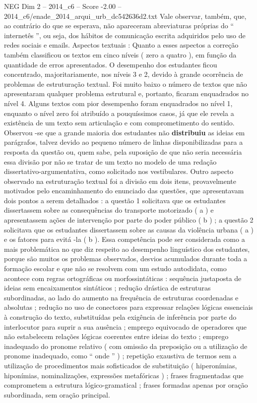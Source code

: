 \begin{textsample}{NEG Dim 2 – 2014\_c6 – Score -2.00 – 2014\_c6/enade\_2014\_arqui\_urb\_dc542636d2.txt}
Vale observar, também, que, ao contrário do que se esperava, não apareceram abreviaturas próprias do “ internetês ”, ou seja, dos hábitos de comunicação escrita adquiridos pelo uso de redes sociais e emails.
Aspectos textuais : Quanto a esses aspectos a correção também classificou os textos em cinco níveis ( zero a quatro ), em função da quantidade de erros apresentados.
O desempenho dos estudantes ficou concentrado, majoritariamente, nos níveis 3 e 2, devido à grande ocorrência de problemas de estruturação textual.
Foi muito baixo o número de textos que não apresentaram qualquer problema estrutural e, portanto, ficaram enquadrados no nível 4.
Alguns textos com pior desempenho foram enquadrados no nível 1, enquanto o nível zero foi atribuído a pouquíssimos casos, já que ele revela a existência de um texto sem articulação e com comprometimento do sentido.
Observou -se que a grande maioria dos estudantes não \textbf{distribuiu} as ideias em parágrafos, talvez devido ao pequeno número de linhas disponibilizadas para a resposta da questão ou, quem sabe, pela suposição de que não seria necessária essa divisão por não se tratar de um texto no modelo de uma redação dissertativo-argumentativa, como solicitado nos vestibulares.
Outro aspecto observado na estruturação textual foi a divisão em dois itens, provavelmente motivados pelo encaminhamento do enunciado das questões, que apresentavam dois pontos a serem detalhados : a questão 1 solicitava que os estudantes dissertassem sobre as consequências do transporte motorizado ( a ) e apresentassem ações de intervenção por parte do poder público ( b ) ; a questão 2 solicitava que os estudantes dissertassem sobre as causas da violência urbana ( a ) e os fatores para evitá -la ( b ).
Essa competência pode ser considerada como a mais problemática no que diz respeito ao desempenho linguístico dos estudantes, porque são muitos os problemas observados, desvios acumulados durante toda a formação escolar e que não se resolvem com um estudo autodidata, como acontece com regras ortográficas ou morfossintáticas : sequência justaposta de ideias sem encaixamentos sintáticos ; redução drástica de estruturas subordinadas, ao lado do aumento na frequência de estruturas coordenadas e absolutas ; redução no uso de conectores para expressar relações lógicas essenciais à construção do texto, substituídas pela exigência de inferência por parte do interlocutor para suprir a sua ausência ; emprego equivocado de operadores que não estabelecem relações lógicas coerentes entre ideias do texto ; emprego inadequado do pronome relativo ( com omissão da preposição ou a utilização de pronome inadequado, como “ onde ” ) ; repetição exaustiva de termos sem a utilização de procedimentos mais sofisticados de substituição ( hiperonímias, hiponímias, nominalizações, expressões metafóricas ) ; frases fragmentadas que comprometem a estrutura lógico-gramatical ; frases formadas apenas por oração subordinada, sem oração principal.

\end{textsample}
